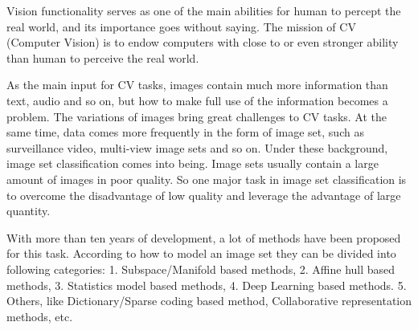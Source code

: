 \begin{eabstract} 
Vision functionality serves as one of the main abilities for human to percept the real world, and its importance goes without saying. The mission of CV (Computer Vision) is to endow computers with close to or even stronger ability than human to perceive the real world. 

As the main input for CV tasks, images contain much more information than text, audio and so on, but how to make full use of the information becomes a problem. The variations of images bring great challenges to CV tasks. At the same time, data comes more frequently in the form of image set, such as surveillance video, multi-view image sets and so on. Under these background, image set classification comes into being. Image sets usually contain a large amount of images in poor quality. So one major task in image set classification is to overcome the disadvantage of low quality and leverage the advantage of large quantity. 

With more than ten years of development, a lot of methods have been proposed for this task. According to how to model an image set they can be divided into following categories: 1. Subspace/Manifold based methods, 2. Affine hull based methods, 3. Statistics model based methods, 4. Deep Learning based methods. 5. Others, like Dictionary/Sparse coding based method, Collaborative representation methods, etc.


\end{eabstract}
